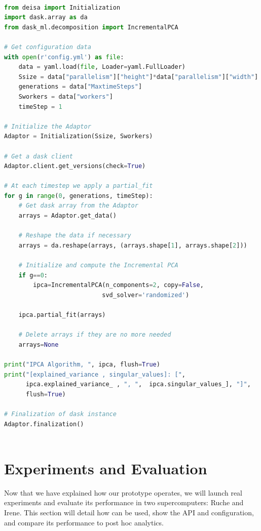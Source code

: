 \begin{lstlisting}[float, label=list:deisaanalyse, language=python, caption= Deisa Client interface]

from deisa import Initialization
import dask.array as da
from dask_ml.decomposition import IncrementalPCA

# Get configuration data
with open(r'config.yml') as file:
    data = yaml.load(file, Loader=yaml.FullLoader)
    Ssize = data["parallelism"]["height"]*data["parallelism"]["width"]
    generations = data["MaxtimeSteps"]
    Sworkers = data["workers"]
    timeStep = 1

# Initialize the Adaptor 
Adaptor = Initialization(Ssize, Sworkers)

# Get a dask client 
Adaptor.client.get_versions(check=True)

# At each timestep we apply a partial_fit
for g in range(0, generations, timeStep):  
    # Get dask array from the Adaptor 
    arrays = Adaptor.get_data()

    # Reshape the data if necessary 
    arrays = da.reshape(arrays, (arrays.shape[1], arrays.shape[2])) 

    # Initialize and compute the Incremental PCA
    if g==0:
        ipca=IncrementalPCA(n_components=2, copy=False, 
                           svd_solver='randomized')

    ipca.partial_fit(arrays)

    # Delete arrays if they are no more needed
    arrays=None

print("IPCA Algorithm, ", ipca, flush=True)
print("[explained_variance , singular_values]: [", 
      ipca.explained_variance_ , ", ",  ipca.singular_values_], "]", 
      flush=True)

# Finalization of dask instance
Adaptor.finalization()
    
\end{lstlisting}

\section{Experiments and Evaluation}\label{sec:evaldeisa}
Now that we have explained how our \deisa prototype operates, we will launch real experiments and evaluate its performance in two supercomputers: Ruche and Irene. This section will detail how \deisa can be used, show the API and configuration, and compare its performance to post hoc analytics.  


